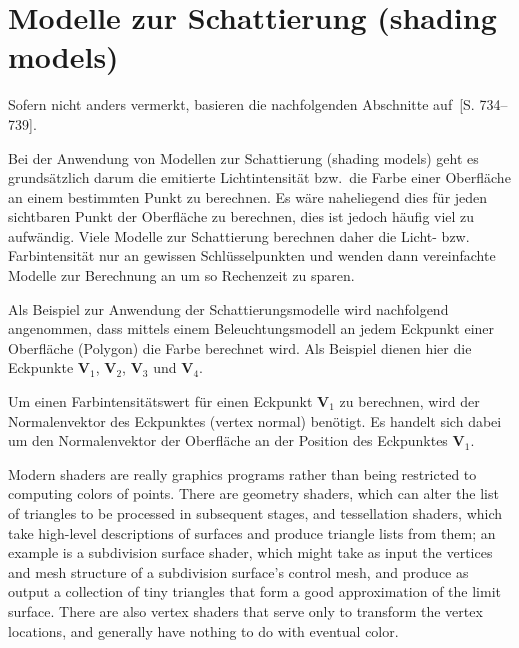 
\section{Modelle zur Schattierung (shading models)}
\label{sec:shading}


Sofern nicht anders vermerkt, basieren die nachfolgenden Abschnitte
auf~\cite{foley_computer_1996}[S. 734–739].

Bei der Anwendung von Modellen zur Schattierung (shading models) geht es
grundsätzlich darum die emitierte Lichtintensität bzw.\ die Farbe einer
Oberfläche an einem bestimmten Punkt zu berechnen. Es wäre naheliegend
dies für jeden sichtbaren Punkt der Oberfläche zu berechnen, dies ist
jedoch häufig viel zu aufwändig. Viele Modelle zur Schattierung
berechnen daher die Licht- bzw. Farbintensität nur an gewissen
Schlüsselpunkten und wenden dann vereinfachte Modelle zur Berechnung an
um so Rechenzeit zu sparen.

Als Beispiel zur Anwendung der Schattierungsmodelle wird nachfolgend
angenommen, dass mittels einem Beleuchtungsmodell an jedem Eckpunkt einer
Oberfläche (Polygon) die Farbe berechnet wird. Als Beispiel dienen hier die
Eckpunkte $\bm{V}_{1}$, $\bm{V}_{2}$, $\bm{V}_{3}$ und $\bm{V}_{4}$.

Um einen Farbintensitätswert für einen Eckpunkt $\bm{V}_{1}$ zu berechnen, wird der
Normalenvektor des Eckpunktes (vertex normal) benötigt. Es handelt sich dabei
um den Normalenvektor der Oberfläche an der Position des Eckpunktes $\bm{V}_{1}$.

Modern shaders are really graphics programs rather than being restricted to
computing colors of points. There are geometry shaders, which can alter the
list of triangles to be processed in subsequent stages, and tessellation
shaders, which take high-level descriptions of surfaces and produce triangle
lists from them; an example is a subdivision surface shader, which might take
as input the vertices and mesh structure of a subdivision surface’s control
mesh, and produce as output a collection of tiny triangles that form a good
approximation of the limit surface. There are also vertex shaders that serve
only to transform the vertex locations, and generally have nothing to do with
eventual color.

